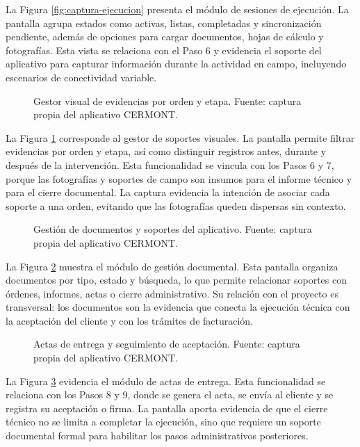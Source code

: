 La Figura \ref{fig:captura-ejecucion} presenta el módulo de sesiones de ejecución. La pantalla agrupa estados como activas, listas, completadas y sincronización pendiente, además de opciones para cargar documentos, hojas de cálculo y fotografías. Esta vista se relaciona con el Paso 6 y evidencia el soporte del aplicativo para capturar información durante la actividad en campo, incluyendo escenarios de conectividad variable.

\begin{figure}[H]
\centering
{}
\caption{Gestor visual de evidencias por orden y etapa. Fuente: captura propia del aplicativo CERMONT.}
\label{fig:captura-evidencias}
\end{figure}

La Figura \ref{fig:captura-evidencias} corresponde al gestor de soportes visuales. La pantalla permite filtrar evidencias por orden y etapa, así como distinguir registros antes, durante y después de la intervención. Esta funcionalidad se vincula con los Pasos 6 y 7, porque las fotografías y soportes de campo son insumos para el informe técnico y para el cierre documental. La captura evidencia la intención de asociar cada soporte a una orden, evitando que las fotografías queden dispersas sin contexto.

\begin{figure}[H]
\centering
{}
\caption{Gestión de documentos y soportes del aplicativo. Fuente: captura propia del aplicativo CERMONT.}
\label{fig:captura-gestion-documentos}
\end{figure}

La Figura \ref{fig:captura-gestion-documentos} muestra el módulo de gestión documental. Esta pantalla organiza documentos por tipo, estado y búsqueda, lo que permite relacionar soportes con órdenes, informes, actas o cierre administrativo. Su relación con el proyecto es transversal: los documentos son la evidencia que conecta la ejecución técnica con la aceptación del cliente y con los trámites de facturación.

\begin{figure}[H]
\centering
{}
\caption{Actas de entrega y seguimiento de aceptación. Fuente: captura propia del aplicativo CERMONT.}
\label{fig:captura-actas-entrega}
\end{figure}

La Figura \ref{fig:captura-actas-entrega} evidencia el módulo de actas de entrega. Esta funcionalidad se relaciona con los Pasos 8 y 9, donde se genera el acta, se envía al cliente y se registra su aceptación o firma. La pantalla aporta evidencia de que el cierre técnico no se limita a completar la ejecución, sino que requiere un soporte documental formal para habilitar los pasos administrativos posteriores.

